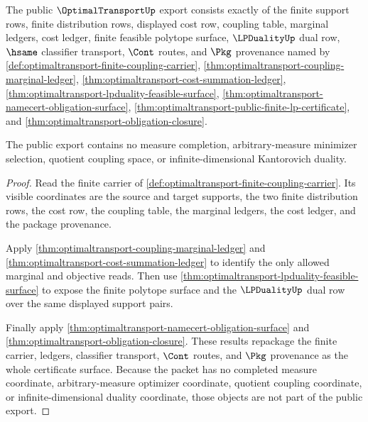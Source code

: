 \begin{theorem}
\label{thm:optimaltransport-public-export-surface}
The public $\OptimalTransportUp$ export consists exactly of the finite support
rows, finite distribution rows, displayed cost row, coupling table, marginal
ledgers, cost ledger, finite feasible polytope surface, $\LPDualityUp$ dual row,
$\hsame$ classifier transport, $\Cont$ routes, and $\Pkg$ provenance named by
\autoref{def:optimaltransport-finite-coupling-carrier},
\autoref{thm:optimaltransport-coupling-marginal-ledger},
\autoref{thm:optimaltransport-cost-summation-ledger},
\autoref{thm:optimaltransport-lpduality-feasible-surface},
\autoref{thm:optimaltransport-namecert-obligation-surface},
\autoref{thm:optimaltransport-public-finite-lp-certificate}, and
\autoref{thm:optimaltransport-obligation-closure}.

The public export contains no measure completion, arbitrary-measure minimizer
selection, quotient coupling space, or infinite-dimensional Kantorovich duality.
\end{theorem}
\begin{proof}
Read the finite carrier of
\autoref{def:optimaltransport-finite-coupling-carrier}. Its visible coordinates
are the source and target supports, the two finite distribution rows, the cost
row, the coupling table, the marginal ledgers, the cost ledger, and the package
provenance.

Apply \autoref{thm:optimaltransport-coupling-marginal-ledger} and
\autoref{thm:optimaltransport-cost-summation-ledger} to identify the only
allowed marginal and objective reads. Then use
\autoref{thm:optimaltransport-lpduality-feasible-surface} to expose the finite
polytope surface and the $\LPDualityUp$ dual row over the same displayed support
pairs.

Finally apply \autoref{thm:optimaltransport-namecert-obligation-surface} and
\autoref{thm:optimaltransport-obligation-closure}. These results repackage the
finite carrier, ledgers, classifier transport, $\Cont$ routes, and $\Pkg$
provenance as the whole certificate surface. Because the packet has no completed
measure coordinate, arbitrary-measure optimizer coordinate, quotient coupling
coordinate, or infinite-dimensional duality coordinate, those objects are not
part of the public export.
\end{proof}


